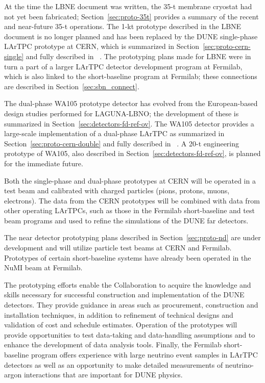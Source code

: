 At the time the LBNE document was written, the 35-t membrane cryostat
had not yet been fabricated; Section~\ref{sec:proto-35t} provides a
summary of the recent and near-future 35-t operations.  The 1-kt
prototype described in the LBNE document is no longer planned and has
been replaced by the DUNE single-phase LArTPC prototype at CERN, which
is summarized in Section~\ref{sec:proto-cern-single} and fully
described in \anxcernproto~\cite{cdr-annex-singleph-proto}.  The prototyping plans made for LBNE were
in turn a part of a larger LArTPC detector development program at
Fermilab, which is also linked to the short-baseline program at
Fermilab; these connections are described in
Section~\ref{sec:sbn_connect}.

The dual-phase WA105 prototype detector has evolved from the
European-based design studies performed for LAGUNA-LBNO; the
development of these is summarized in
Section~\ref{sec:detectors-fd-ref-ov}.  The WA105 detector provides a
large-scale implementation of a dual-phase LArTPC as summarized 
in Section~\ref{sec:proto-cern-double} and fully described in
\anxdualtdr~\cite{WA105_TDR}.  A 20-t engineering prototype of WA105, also described in
Section~\ref{sec:detectors-fd-ref-ov}, is planned for the immediate
future.

Both the single-phase and dual-phase prototypes at CERN will be
operated in a test beam and calibrated with charged particles (pions,
protons, muons, electrons). The data from the CERN prototypes will be
combined with data from other operating LArTPCs, such as those in the
Fermilab short-baseline and test beam programs and used to refine the
simulations of the DUNE far detectors.

The near detector prototyping plans described in
Section~\ref{sec:proto-nd} are under development and will
utilize particle test beams at CERN and Fermilab.  Prototypes
of certain short-baseline systems have already been operated in the
NuMI beam at Fermilab.

The prototyping efforts enable the Collaboration
to acquire the knowledge and skills necessary for successful
construction and implementation of the DUNE detectors. They provide
guidance in areas such as procurement, construction and installation
techniques, in addition to refinement of technical designs and validation of
cost and schedule estimates.  Operation of the prototypes will provide
opportunities to test data-taking and data-handling assumptions and
to enhance the development of data analysis tools.  Finally, the
Fermilab short-baseline program offers experience with large neutrino
event samples in LArTPC detectors as well as an opportunity to make
detailed measurements of neutrino-argon interactions that are
important for DUNE physics. 

